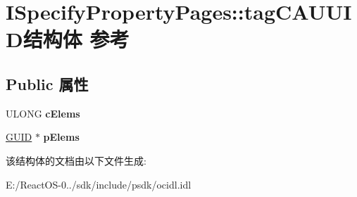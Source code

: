 \hypertarget{struct_i_specify_property_pages_1_1tag_c_a_u_u_i_d}{}\section{I\+Specify\+Property\+Pages\+:\+:tag\+C\+A\+U\+U\+I\+D结构体 参考}
\label{struct_i_specify_property_pages_1_1tag_c_a_u_u_i_d}
\subsection*{Public 属性}
\begin{DoxyCompactItemize}
\item 
\mbox{\label{struct_i_specify_property_pages_1_1tag_c_a_u_u_i_d_a53f2da6225d48ad7b676070e5cb100a9}} 
U\+L\+O\+NG {\bfseries c\+Elems}
\item 
\mbox{\label{struct_i_specify_property_pages_1_1tag_c_a_u_u_i_d_a35ffaa70c265888a398fb2b0873f1ef4}} 
\hyperlink{interface_g_u_i_d}{G\+U\+ID} $\ast$ {\bfseries p\+Elems}
\end{DoxyCompactItemize}


该结构体的文档由以下文件生成\+:\begin{DoxyCompactItemize}
\item 
E\+:/\+React\+O\+S-\/0../sdk/include/psdk/ocidl.\+idl\end{DoxyCompactItemize}
